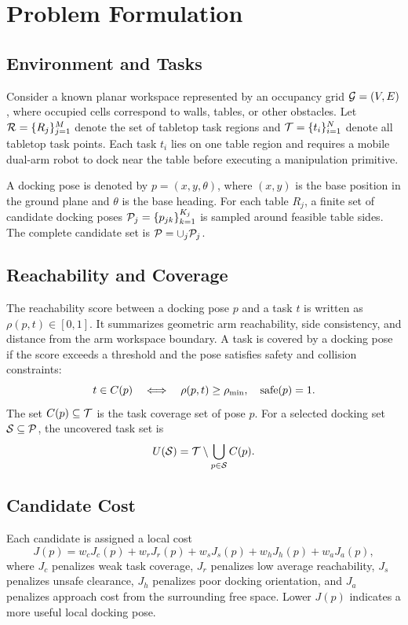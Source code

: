 \section{Problem Formulation}
\label{sec:problem}

\subsection{Environment and Tasks}
Consider a known planar workspace represented by an occupancy grid
\(\mathcal{G}=(V,E)\), where occupied cells correspond to walls, tables, or other obstacles. Let
\(\mathcal{R}=\{R_j\}_{j=1}^{M}\) denote the set of tabletop task regions and
\(\mathcal{T}=\{t_i\}_{i=1}^{N}\) denote all tabletop task points. Each task \(t_i\) lies on one table region and requires a mobile dual-arm robot to dock near the table before executing a manipulation primitive.

A docking pose is denoted by \(p=(x,y,\theta)\), where \((x,y)\) is the base position in the ground plane and \(\theta\) is the base heading. For each table \(R_j\), a finite set of candidate docking poses \(\mathcal{P}_j=\{p_{jk}\}_{k=1}^{K_j}\) is sampled around feasible table sides. The complete candidate set is \(\mathcal{P}=\cup_j \mathcal{P}_j\).

\subsection{Reachability and Coverage}
The reachability score between a docking pose \(p\) and a task \(t\) is written as \(\rho(p,t)\in[0,1]\). It summarizes geometric arm reachability, side consistency, and distance from the arm workspace boundary. A task is covered by a docking pose if the score exceeds a threshold and the pose satisfies safety and collision constraints:
\begin{equation}
    t \in C(p)
    \quad \Longleftrightarrow \quad
    \rho(p,t) \geq \rho_{\min}, \quad \operatorname{safe}(p)=1 .
    \label{eq:coverage}
\end{equation}
The set \(C(p)\subseteq\mathcal{T}\) is the task coverage set of pose \(p\). For a selected docking set \(\mathcal{S}\subseteq\mathcal{P}\), the uncovered task set is
\begin{equation}
    U(\mathcal{S})=\mathcal{T} \setminus \bigcup_{p\in\mathcal{S}} C(p).
    \label{eq:uncovered}
\end{equation}

\subsection{Candidate Cost}
Each candidate is assigned a local cost
\begin{equation}
    J(p)=w_c J_c(p)+w_r J_r(p)+w_s J_s(p)+w_h J_h(p)+w_a J_a(p),
    \label{eq:local_cost}
\end{equation}
where \(J_c\) penalizes weak task coverage, \(J_r\) penalizes low average reachability, \(J_s\) penalizes unsafe clearance, \(J_h\) penalizes poor docking orientation, and \(J_a\) penalizes approach cost from the surrounding free space. Lower \(J(p)\) indicates a more useful local docking pose.

